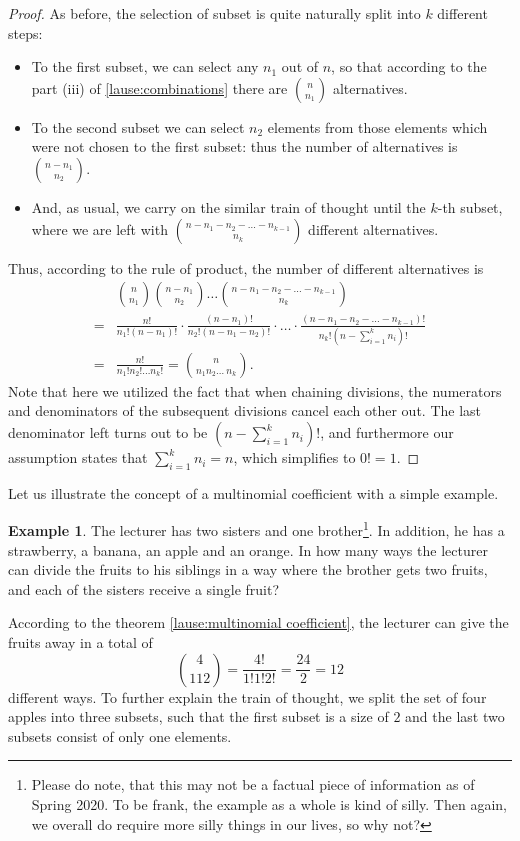 \documentclass[12pt,a4paper,leqno]{report}
\theoremstyle{plain}
\theoremstyle{definition}
\newtheorem{esim}[equation]{Example}
\begin{document}
\begin{proof}
As before, the selection of subset is quite naturally split into $k$ different steps:
\begin{itemize}
\item To the first subset, we can select any $n_1$ out of $n$, so that according to the part (iii) of \ref{lause:combinations} there are $\binom{n}{n_1}$ alternatives.
\item To the second subset we can select $n_2$ elements from those elements which were not chosen to the first subset: thus the number of alternatives is $\binom{n-n_1}{n_2}$.
\item And, as usual, we carry on the similar train of thought until the $k$-th subset, where we are left with $\binom{n - n_1 - n_2 - \dots - n_{k-1}}{n_k}$ different alternatives.
\end{itemize}

Thus, according to the rule of product, the number of different alternatives is
\[
\begin{split}
&\binom{n}{n_1}\binom{n-n_1}{n_2} \dots \binom{n - n_1 - n_2 - \dots - n_{k-1}}{n_k} \\
=& \frac{n!}{n_1!(n-n_1)!} \cdot \frac{(n-n_1)!}{n_2!(n-n_1 - n_2)!} \cdot \dots \cdot \frac{(n - n_1 - n_2 - \dots - n_{k-1})!}{n_k! (n - \sum_{i=1}^k n_i)!} \\
=&\frac{n!}{n_1!n_2! \dots n_k!} = \binom{n}{n_1 n_2 \dots \ n_k}.
\end{split}
\]
Note that here we utilized the fact that when chaining divisions, the numerators and denominators of the subsequent divisions cancel each other out. The last denominator left turns out to be $(n - \sum_{i=1}^k n_i)!$, and furthermore our assumption states that $\sum_{i=1}^k n_i = n$, which simplifies to $0! = 1$. 
\end{proof}

Let us illustrate the concept of a multinomial coefficient with a simple example.

\begin{esim}
The lecturer has two sisters and one brother\footnote{Please do note, that this may not be a factual piece of information as of Spring 2020. To be frank, the example as a whole is kind of silly. Then again, we overall do require more silly things in our lives, so why not?}. In addition, he has a strawberry, a banana, an apple and an orange. In how many ways the lecturer can divide the fruits to his siblings in a way where the brother gets two fruits, and each of the sisters receive a single fruit?

According to the theorem \ref{lause:multinomial coefficient}, the lecturer can give the fruits away in a total of 
\begin{equation}
\binom{4}{1 1 2} = \frac{4!}{1!1!2!} = \frac{24}{2} = 12
\end{equation}
different ways. To further explain the train of thought, we split the set of four apples into three subsets, such that the first subset is a size of $2$ and the last two subsets consist of only one elements.
\end{esim}
\end{document}
